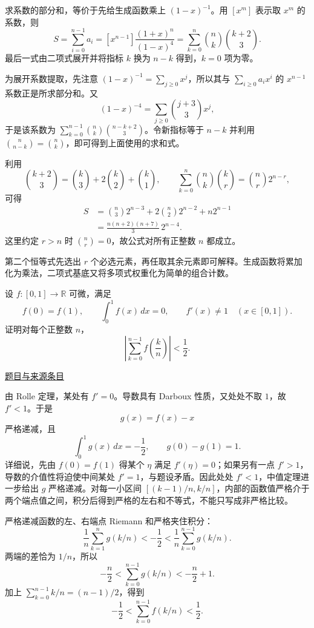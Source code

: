 \documentclass[12pt,fontset=fandol]{ctexart}
\begin{document}
\begin{solve}\label{ans:pre04-math:5}

求系数的部分和，等价于先给生成函数乘上 $(1-x)^{-1}$。用 $[x^m]$ 表示取 $x^m$ 的系数，则
\[
S=\sum_{i=0}^{n-1}a_i
=[x^{n-1}]\frac{(1+x)^n}{(1-x)^4}
=\sum_{k=0}^n\binom nk\binom{k+2}{3}.
\]
最后一式由二项式展开并将指标 $k$ 换为 $n-k$ 得到，$k=0$ 项为零。

为展开系数提取，先注意 $(1-x)^{-1}=\sum_{j\ge0}x^j$，所以其与 $\sum_{i\ge0}a_ix^i$ 的 $x^{n-1}$ 系数正是所求部分和。又
\[
(1-x)^{-4}=\sum_{j\ge0}\binom{j+3}{3}x^j,
\]
于是该系数为 $\sum_{k=0}^{n-1}\binom nk\binom{n-k+2}{3}$。令新指标等于 $n-k$ 并利用 $\binom n{n-k}=\binom nk$，即可得到上面使用的求和式。

利用
\[
\binom{k+2}{3}=\binom k3+2\binom k2+\binom k1,
\qquad
\sum_{k=0}^n\binom nk\binom kr=\binom nr2^{n-r},
\]
可得
\[
\begin{aligned}
S
&=\binom n3 2^{n-3}+2\binom n2 2^{n-2}+n2^{n-1}\\
&=\boxed{\frac{n(n+2)(n+7)}3\,2^{n-4}}.
\end{aligned}
\]
这里约定 $r>n$ 时 $\binom nr=0$，故公式对所有正整数 $n$ 都成立。

\end{solve}

\begin{remark}[方法与条件]第二个恒等式先选出 $r$ 个必选元素，再任取其余元素即可解释。生成函数将累加化为乘法，二项式基底又将多项式权重化为简单的组合计数。\end{remark}

\begin{example}[来源序号6]\label{ex:pre04-math:6}\label{pr:pre04-math:6}

设 $f:[0,1]\to\mathbb R$ 可微，满足
\[
f(0)=f(1),\qquad \int_0^1f(x)\,dx=0,
\qquad f'(x)\ne1\quad(x\in[0,1]).
\]
证明对每个正整数 $n$，
\[
\left|\sum_{k=0}^{n-1}f\left(\frac kn\right)\right|<\frac12.
\]

\par\href{https://github.com/lzxcr/cmc-mathematics/blob/64916fa1fdbc3e444a652eca204d5669058ee321/src/problems/preliminary/04/06.md}{题目与来源条目}

\end{example}

\begin{solve}\label{ans:pre04-math:6}

由 Rolle 定理，某处有 $f'=0$。导数具有 Darboux 性质，又处处不取 $1$，故 $f'<1$。于是
\[
g(x)=f(x)-x
\]
严格递减，且
\[
\int_0^1g(x)\,dx=-\frac12,\qquad g(0)-g(1)=1.
\]
详细说，先由 $f(0)=f(1)$ 得某个 $\eta$ 满足 $f'(\eta)=0$；如果另有一点 $f'>1$，导数的介值性将迫使中间某处 $f'=1$，与题设矛盾。因此处处 $f'<1$，中值定理进一步给出 $g$ 严格递减。对每一小区间 $[(k-1)/n,k/n]$，内部的函数值严格介于两个端点值之间，积分后得到严格的左右和不等式，不能只写成非严格比较。

严格递减函数的左、右端点 Riemann 和严格夹住积分：
\[
\frac1n\sum_{k=1}^{n}g(k/n)
< -\frac12
<\frac1n\sum_{k=0}^{n-1}g(k/n).
\]
两端的差恰为 $1/n$，所以
\[
-\frac n2<\sum_{k=0}^{n-1}g(k/n)<-\frac n2+1.
\]
加上 $\sum_{k=0}^{n-1}k/n=(n-1)/2$，得到
\[
-\frac12<\sum_{k=0}^{n-1}f(k/n)<\frac12.
\]

\end{solve}
\end{document}
